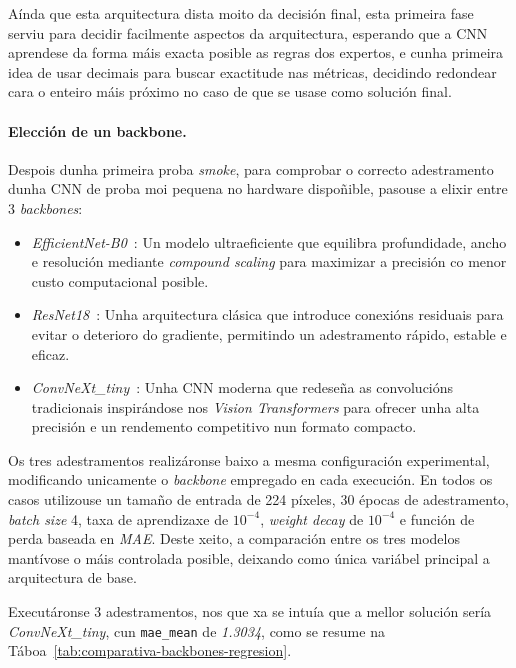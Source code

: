 Aínda que esta arquitectura dista moito da decisión final, esta primeira fase serviu para decidir facilmente aspectos da arquitectura,
esperando que a CNN aprendese da forma máis exacta posible as regras dos expertos, e cunha primeira idea de usar decimais para buscar
exactitude nas métricas, decidindo redondear cara o enteiro máis próximo no caso de que se usase como solución final.

\paragraph{Elección de un \gls{backbone}.}
Despois dunha primeira proba \textit{smoke}, para comprobar o correcto adestramento dunha CNN de proba moi pequena no hardware dispoñible,
pasouse a elixir entre 3 \textit{backbones}:

\begin{itemize}
    \item \textit{EfficientNet-B0}~\cite{DBLP:journals/corr/abs-1905-11946}: Un modelo ultraeficiente que equilibra profundidade, ancho e resolución mediante \textit{compound scaling} para maximizar a precisión co menor custo computacional posible.
    \item \textit{ResNet18}~\cite{DBLP:journals/corr/HeZRS15}: Unha arquitectura clásica que introduce conexións residuais para evitar o deterioro do gradiente, permitindo un adestramento rápido, estable e eficaz.
    \item \textit{ConvNeXt\_tiny}~\cite{DBLP:journals/corr/abs-2201-03545}: Unha CNN moderna que redeseña as convolucións tradicionais inspirándose nos \textit{Vision Transformers} para ofrecer unha alta precisión e un rendemento competitivo nun formato compacto.
\end{itemize}

Os tres adestramentos realizáronse baixo a mesma configuración experimental, modificando unicamente
o \textit{backbone} empregado en cada execución. En todos os casos utilizouse 
un tamaño de entrada de 224 píxeles, 30 épocas de adestramento,
\textit{batch size} 4, taxa de aprendizaxe de $10^{-4}$, \textit{weight decay} de $10^{-4}$ e
función de perda baseada en \textit{MAE}. Deste xeito, a comparación
entre os tres modelos mantívose o máis controlada posible, deixando como única variábel principal a
arquitectura de base.

Executáronse 3 adestramentos, nos que xa se intuía que a mellor solución sería
\textit{ConvNeXt\_tiny}, cun \texttt{mae\_mean} de \textit{1.3034}, como se resume na
Táboa~\ref{tab:comparativa-backbones-regresion}.

